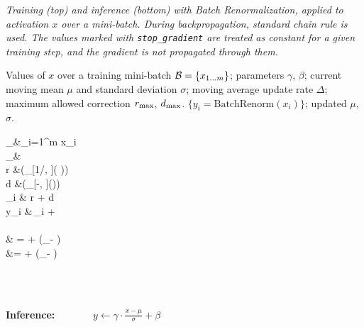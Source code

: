 \begin{algorithm}[t]
  \caption{\em Training (top) and inference (bottom) with Batch Renormalization, applied to activation $x$ over a mini-batch. During backpropagation, standard chain rule is used.
  The values marked with \texttt{stop\_gradient} are treated as constant for a given training step, and the gradient is not propagated through them.
  }
\label{alg-bn}
  \begin{algorithmic}
  \REQUIRE 
  Values of $x$ over a training mini-batch
  $\mathcal{B}=\{x_{1\ldots m}\}$; 
 parameters $\gamma$,
    $\beta$; current moving mean $\mu$ and standard deviation $\sigma$; moving average update rate $\Delta$; maximum allowed correction $r_{\text{max}}$, $d_{\text{max}}$.
  \ENSURE $\{y_i =  \text{BatchRenorm}(x_i)\}$; updated $\mu$, $\sigma$.
  \begin{flalign*}
      \mu_\setB &\leftarrow  {}\sum_{i=1}^m x_i \\
  \sigma_\setB &\leftarrow  {}
\\
  r &\leftarrow {}\left(_{[1/\rmax, \rmax]}\left( \frac{\sigma_\setB}{\sigma}\right)\right) \\
  d &\leftarrow  {}\left(_{[-\dmax, \dmax]}\left(\frac{\mu_\setB-\mu}{\sigma}\right)\right)
  \\
\xhat_i &\leftarrow {} \cdot r + d 
\\
  y_i &\leftarrow \gamma\,\xhat_i + \beta   \\
  \\
  \mu & \mathrel{:}= \mu + \Delta (\mu_\setB - \mu) \hspace{0.2in} \\
  \sigma &\mathrel{:}=  \sigma + \Delta (\sigma_\setB - \sigma) 
  \end{flalign*} 
  \hspace{-.1in}\hrulefill\hspace{.03in}\\
  \vspace{-0.1in}
    \hspace{-.1in}\hrulefill\hspace{.03in}\\
  \vspace{.2in}
  \item[\textbf{Inference:}]\ \ \ \ \ \ \  
  $\displaystyle y\leftarrow \gamma\cdot \frac{x-\mu}{\sigma} + \beta$
    \vspace{.1in}
\end{algorithmic}
\end{algorithm}

